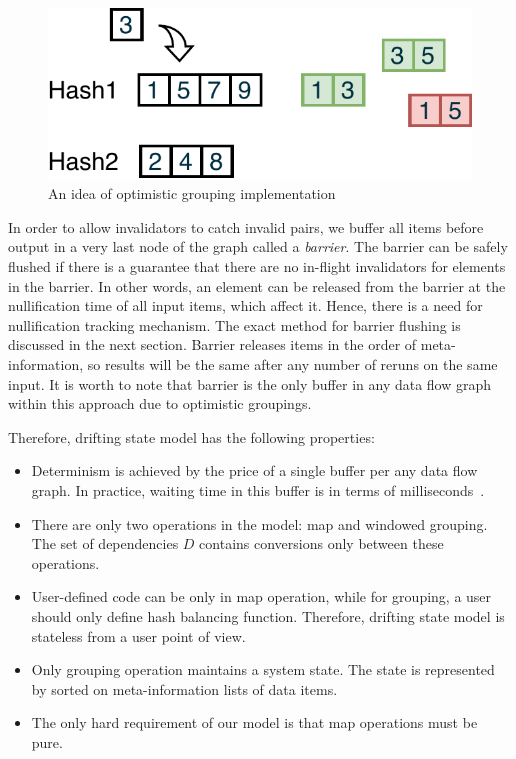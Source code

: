 \begin{figure}[htbp]
  \centering
  \includegraphics[width=.35\textwidth]{pics/grouping-invalidation}
  \caption{An idea of optimistic grouping implementation}
  \label {optimistic-grouping}
\end{figure} 
 
In order to allow invalidators to catch invalid pairs, we buffer all items before output in a very last node of the graph called a {\em barrier}. The barrier can be safely flushed if there is a guarantee that there are no in-flight invalidators for elements in the barrier. In other words, an element can be released from the barrier at the nullification time of all input items, which affect it. Hence, there is a need for nullification tracking mechanism. The exact method for barrier flushing is discussed in the next section. Barrier releases items in the order of meta-information, so results will be the same after any number of reruns on the same input. It is worth to note that barrier is the only buffer in any data flow graph within this approach due to optimistic groupings. 

Therefore, drifting state model has the following properties:
\begin{itemize}
    \item Determinism is achieved by the price of a single buffer per any data flow graph. In practice, waiting time in this buffer is in terms of milliseconds~\cite{we2018adbis}.
    \item There are only two operations in the model: map and windowed grouping. The set of dependencies $D$ contains conversions only between these operations.
    \item User-defined code can be only in map operation, while for grouping, a user should only define hash balancing function. Therefore, drifting state model is stateless from a user point of view.
    \item Only grouping operation maintains a system state. The state is represented by sorted on meta-information lists of data items.
    \item The only hard requirement of our model is that map operations must be pure.
\end{itemize}


